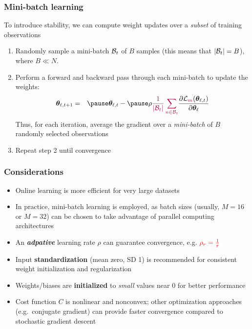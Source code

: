 \documentclass[smaller, handout]{beamer}
\begin{document}
\begin{frame}
  \frametitle{Mini-batch learning}
  \pause
  To introduce stability, we can compute weight updates over a \textit{\pl subset} of training observations

  \begin{enumerate}[<+->]
  \item Randomly sample a mini-batch $\mathcal{B}_{t}$ of $B$ samples (this means that $|\mathcal{B}_{t}|=B$), where $B \ll N$.
  \item Perform a forward and backward pass through each mini-batch to update the weights:\pause
      \begin{eqnarray}
    \bm\th_{\ell, t+1}  &=& \pause  \bm\th_{\ell,t} - \pause \rho{\pl  \fr1{|\mc{B}_{t}|} \sum_{n\in\mc{B}_{t}}} \pd{\mc{L}_{\pl m}(\bm \th_{\ell,t})}{\bm\th_{\ell}} 
  \end{eqnarray}
  \pause
  Thus, for each iteration, average the gradient over a \textit{\pl mini-batch} of $B$ randomly selected observations
\item Repeat step 2 until convergence
  \end{enumerate}  
\end{frame}

\begin{frame}
  \frametitle{Considerations}
  \pause
  \begin{itemize}[<+->]
  \item Online learning is more efficient for very large datasets
  \item In practice, mini-batch learning is employed, as batch sizes (usually, $M=16$ or $M=32$) can be chosen to take advantage of parallel computing architectures
  \item An \textit{\bf \rd adpative} learning rate $\rho$ can guarantee convergence, e.g. $\color{red} \rho_r = \frac1r$
  

  \item Input \textbf{standardization} (mean zero, SD 1) is recommended for consistent weight initialization and regularization
  \item Weights/biases are \textbf{initialized} to \textit{small} values near 0 for better performance
  \item Cost function $C$ is nonlinear and nonconvex; other optimization approaches (e.g.\ conjugate gradient) can
    provide faster convergence compared to stochastic gradient descent
  \end{itemize}
\end{frame}
\end{document}
